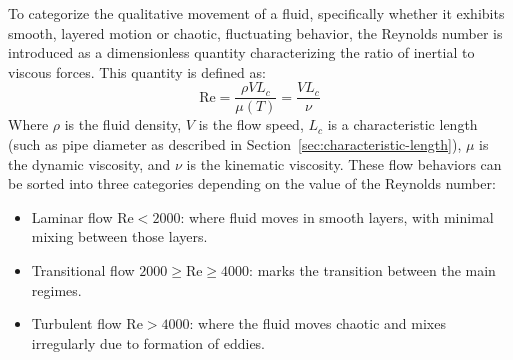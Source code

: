 
To categorize the qualitative movement of a fluid, specifically whether it exhibits smooth, layered motion or chaotic, fluctuating behavior, the Reynolds number is introduced as a dimensionless quantity characterizing the ratio of inertial to viscous forces.
This quantity is defined as:
\begin{equation}
	\mathrm{Re} = \frac{\rho V L_c}{\mu(T)} = \frac{V L_c}{\nu}
	\label{eq:reynolds-number}
\end{equation}
Where $\rho$ is the fluid density, $V$ is the flow speed, $L_c$ is a characteristic length (such as pipe diameter as described in Section~\ref{sec:characteristic-length}), $\mu$ is the dynamic viscosity, and $\nu$ is the kinematic viscosity.
These flow behaviors can be sorted into three categories depending on the value of the Reynolds number:
\cite{Cengel2017, anderson2021modern}
\begin{itemize}
	\item Laminar flow $\mathrm{Re} < 2000$: where fluid moves in smooth layers, with minimal mixing between those layers.
	\item Transitional flow $2000 \ge \mathrm{Re} \ge 4000$: marks the transition between the main regimes.
	\item Turbulent flow $\mathrm{Re} > 4000$: where the fluid moves chaotic and mixes irregularly due to formation of eddies.
\end{itemize}
